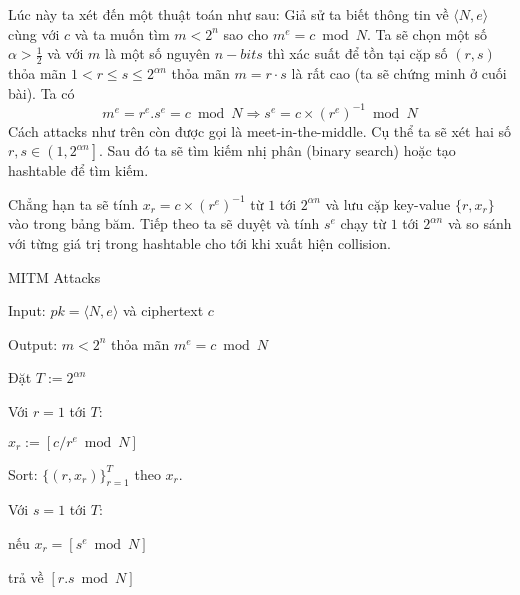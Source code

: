 \documentclass[12pt]{article}
\begin{document}
Lúc này ta xét đến một thuật toán như sau: Giả sử ta biết thông tin về $\displaystyle \langle N,e\rangle $ cùng với $\displaystyle c$ và ta muốn tìm $\displaystyle m< 2^{n}$ sao cho $\displaystyle m^{e} =c\bmod N$. Ta sẽ chọn một số $\displaystyle \alpha  >\frac{1}{2}$ và với $\displaystyle m$ là một số nguyên $\displaystyle n-bits$ thì xác suất để tồn tại cặp số $\displaystyle ( r,s)$ thỏa mãn $\displaystyle 1< r\leqslant s\leqslant 2^{\alpha n}$ thỏa mãn $\displaystyle m=r\cdotp s$ là rất cao (ta sẽ chứng minh ở cuối bài). Ta có 
\begin{equation*}
m^{e} =r^{e} .s^{e} =c\bmod N\Longrightarrow s^{e} =c\times \left( r^{e}\right)^{-1}\bmod N
\end{equation*}
Cách attacks như trên còn được gọi là meet-in-the-middle. Cụ thể ta sẽ xét hai số $\displaystyle r,s\in \left( 1,2^{\alpha n}\right]$. Sau đó ta sẽ tìm kiếm nhị phân (binary search) hoặc tạo hashtable để tìm kiếm. 

Chẳng hạn ta sẽ tính $\displaystyle x_{r} =c\times \left( r^{e}\right)^{-1}$ từ $\displaystyle 1$ tới $\displaystyle 2^{\alpha n}$ và lưu cặp key-value $\displaystyle \{r,x_{r}\}$ vào trong bảng băm. Tiếp theo ta sẽ duyệt và tính $\displaystyle s^{e}$ chạy từ $\displaystyle 1$ tới $\displaystyle 2^{\alpha n}$ và so sánh với từng giá trị trong hashtable cho tới khi xuất hiện collision.


\begin{constructionbox}{MITM Attacks}

Input: $\displaystyle pk=\langle N,e\rangle $ và ciphertext $\displaystyle c$

Output: $\displaystyle m< 2^{n}$ thỏa mãn $\displaystyle m^{e} =c\bmod N$

Đặt $\displaystyle T:=2^{\alpha n}$

Với $\displaystyle r=1$ tới $\displaystyle T$:

	$\displaystyle x_{r} :=\left[ c/r^{e}\bmod N\right]$

Sort: $\displaystyle \{( r,x_{r})\}_{r=1}^{T}$ theo $\displaystyle x_{r}$. 

Với $\displaystyle s=1$ tới $\displaystyle T$:

	nếu $\displaystyle x_{r} =\left[ s^{e}\bmod N\right]$

		trả về $\displaystyle [ r.s\bmod N]$
        
\end{constructionbox}
\end{document}
